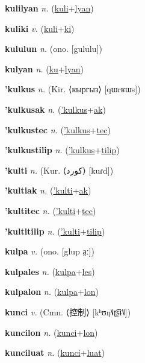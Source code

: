 \textbf{\hypertarget{kulilyan}{kulilyan}} \textit{n.} (\hyperlink{kuli}{kuli}+\allowbreak \hyperlink{lyan}{lyan})


\textbf{\hypertarget{kuliki}{kuliki}} \textit{v.} (\hyperlink{kuli}{kuli}+\allowbreak \hyperlink{ki}{ki})


\textbf{\hypertarget{kululun}{kululun}} \textit{n.} (ono. [gululu])


\textbf{\hypertarget{kulyan}{kulyan}} \textit{n.} (\hyperlink{ku}{ku}+\allowbreak \hyperlink{lyan}{lyan})


\textbf{\hypertarget{'kulkus}{'kulkus}} \textit{n.} (Kir. ⟨кыргыз⟩ [qɯrʁɯs])


\textbf{\hypertarget{'kulkusak}{'kulkusak}} \textit{n.} (\hyperlink{'kulkus}{'kulkus}+\allowbreak \hyperlink{ak}{ak})


\textbf{\hypertarget{'kulkustec}{'kulkustec}} \textit{n.} (\hyperlink{'kulkus}{'kulkus}+\allowbreak \hyperlink{tec}{tec})


\textbf{\hypertarget{'kulkustilip}{'kulkustilip}} \textit{n.} (\hyperlink{'kulkus}{'kulkus}+\allowbreak \hyperlink{tilip}{tilip})


\textbf{\hypertarget{'kulti}{'kulti}} \textit{n.} (Kur. ⟨{\arabics{}کورد‎}⟩ [kuɾd])


\textbf{\hypertarget{'kultiak}{'kultiak}} \textit{n.} (\hyperlink{'kulti}{'kulti}+\allowbreak \hyperlink{ak}{ak})


\textbf{\hypertarget{'kultitec}{'kultitec}} \textit{n.} (\hyperlink{'kulti}{'kulti}+\allowbreak \hyperlink{tec}{tec})


\textbf{\hypertarget{'kultitilip}{'kultitilip}} \textit{n.} (\hyperlink{'kulti}{'kulti}+\allowbreak \hyperlink{tilip}{tilip})


\textbf{\hypertarget{kulpa}{kulpa}} \textit{v.} (ono. [glup a̤ː])


\textbf{\hypertarget{kulpales}{kulpales}} \textit{n.} (\hyperlink{kulpa}{kulpa}+\allowbreak \hyperlink{les}{les})


\textbf{\hypertarget{kulpalon}{kulpalon}} \textit{n.} (\hyperlink{kulpa}{kulpa}+\allowbreak \hyperlink{lon}{lon})


\textbf{\hypertarget{kunci}{kunci}} \textit{v.} (Cmn. ⟨{\chinese{}控制}⟩ [kʰʊŋ˥˩ʈ͡ʂɨ˥˩])


\textbf{\hypertarget{kuncilon}{kuncilon}} \textit{n.} (\hyperlink{kunci}{kunci}+\allowbreak \hyperlink{lon}{lon})


\textbf{\hypertarget{kunciluat}{kunciluat}} \textit{n.} (\hyperlink{kunci}{kunci}+\allowbreak \hyperlink{luat}{luat})


